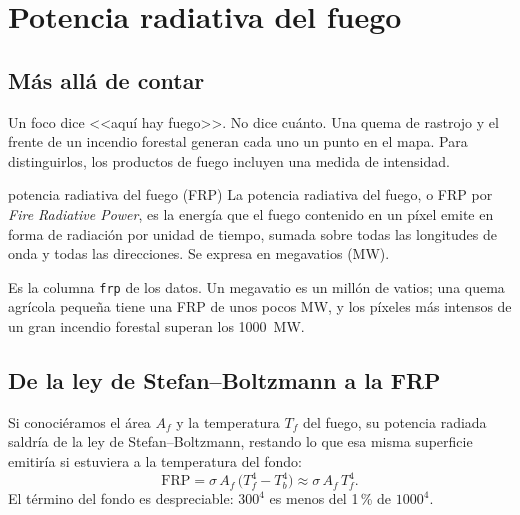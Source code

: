 \chapter{Potencia radiativa del fuego}\label{cap:frp}


\section{Más allá de contar}

Un foco dice <<aquí hay fuego>>. No dice cuánto. Una quema de rastrojo y el frente de un incendio
forestal generan cada uno un punto en el mapa. Para distinguirlos, los productos de fuego
incluyen una medida de intensidad.

\begin{definicion}{potencia radiativa del fuego (FRP)}
La potencia radiativa del fuego, o FRP por \emph{Fire Radiative Power}, es la energía que el
fuego contenido en un píxel emite en forma de radiación por unidad de tiempo, sumada sobre todas
las longitudes de onda y todas las direcciones. Se expresa en megavatios (MW).
\end{definicion}

Es la columna \texttt{frp} de los datos. Un megavatio es un millón de vatios; una quema agrícola
pequeña tiene una FRP de unos pocos MW, y los píxeles más intensos de un gran incendio forestal
superan los 1000~MW.

\section{De la ley de Stefan--Boltzmann a la FRP}

Si conociéramos el área $A_f$ y la temperatura $T_f$ del fuego, su potencia radiada saldría de
la ley de Stefan--Boltzmann, restando lo que esa misma superficie emitiría si estuviera a la
temperatura del fondo:
\begin{equation}\label{eq:frp-sb}
  \mathrm{FRP} = \sigma\,A_f\,\bigl(T_f^4 - T_b^4\bigr) \approx \sigma\,A_f\,T_f^4 .
\end{equation}
El término del fondo es despreciable: $300^4$ es menos del 1\,{}\% de $1000^4$.

